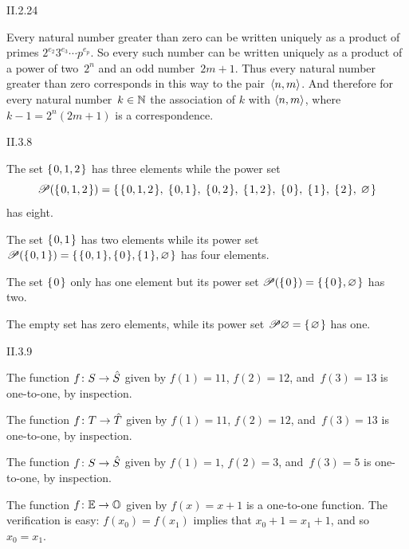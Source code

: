 %
%
\begin{ans}{II.2.24}
\begin{exparts}
\item
Every natural number greater than zero can be written uniquely
as a product of primes $2^{e_2}3^{e_3}\cdots p^{e_p}$.
So every such number can be written uniquely as
a product of a power of two~$2^{n}$ and an odd number~$2m+1$.
Thus every natural number greater than zero corresponds in this
way to the pair~$\langle n,m\rangle$.
And therefore for every natural number~$k\in\mathbb{N}$ the association of
$k$ with $\langle n,m\rangle$, where $k-1=2^{n}(2m+1)$ is a correspondence.

\item
\end{exparts}
\end{ans}
%
\begin{ans}{II.3.8}
\begin{exparts}
\item The set $\set{0,1,2}$ has three elements while the power set
\begin{equation*}
  \powerset(\set{0,1,2})=
  \set{\set{0,1,2},\; \set{0,1},\; \set{0,2},\; \set{1,2},\;
       \set{0},\; \set{1},\; \set{2},\; \emptyset}
\end{equation*}
has eight.
\item The set $\set{0,1}$ has two elements while its power set
$\powerset(\set{0,1})=\set{\set{0,1},\set{0},\set{1},\emptyset}$
has four elements.
\item The set $\set{0}$ only has one element but its power set
$\powerset(\set{0})=\set{\set{0},\emptyset}$ has two.
\item The empty set has zero elements, while its power set
$\powerset{\emptyset}=\set{\emptyset}$ has one.
\end{exparts}
\end{ans}
%
\begin{ans}{II.3.9}
\begin{exparts}
\item The function $\mbox{$f\colon S\to \hat{S}$}$ given by $f(1)=11$, $f(2)=12$,
and~$f(3)=13$ is one-to-one, by inspection.
\item The function $\mbox{$f\colon T\to \hat{T}$}$ given by $f(1)=11$, $f(2)=12$,
and~$f(3)=13$ is one-to-one, by inspection.
\item The function $\mbox{$f\colon S\to \hat{S}$}$ given by $f(1)=1$, $f(2)=3$,
and~$f(3)=5$ is one-to-one, by inspection.
\item
The function  $\mbox{$f\colon \mathbb{E}\to \mathbb{O}$}$ given by
$f(x)=x+1$ is a one-to-one function.
The verification is easy: $f(x_0)=f(x_1)$ implies that $x_0+1=x_1+1$,
and so $x_0=x_1$.
\end{exparts}
\end{ans}
